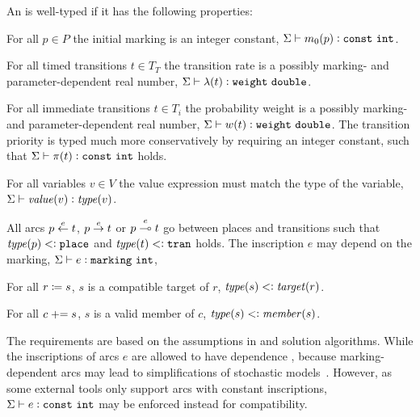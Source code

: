 \begin{dfn}
  An  is well-typed if it has the following properties:
  \begin{compactitem}
  \item For all \(p \in P\) the initial marking is an integer constant, \(\Sigma \vdash m_0(p) \mathrel{\vcentcolon} \texttt{\upshape const}\ \texttt{\upshape int}\).
  \item For all timed transitions \(t \in T_T\) the transition rate is a possibly marking- and parameter-dependent real number, \(\Sigma \vdash \lambda(t) \mathrel{\vcentcolon} \texttt{\upshape weight}\ \texttt{\upshape double}\).
  \item For all immediate transitions \(t \in T_i\) the probability weight is a possibly marking- and parameter-dependent real number, \(\Sigma \vdash w(t) \mathrel{\vcentcolon} \texttt{\upshape weight}\ \texttt{\upshape double}\). The transition priority is typed much more conservatively by requiring an integer constant, such that \(\Sigma \vdash \pi(t) \mathrel{\vcentcolon} \texttt{\upshape const}\ \texttt{\upshape int}\) holds.
  \item For all variables \(v \in V\) the value expression must match the type of the variable, \(\Sigma \vdash \textrm{\itshape value\/}(v) \mathrel{\vcentcolon} \textrm{\itshape type\/}(v)\).
  \item All arcs \(p \overset{e}{\leftarrow} t\), \(p \overset{e}{\rightarrow} t\) or \(p \overset{e}{\multimap} t\) go between places and transitions such that \(\textrm{\itshape type\/}(p) \mathrel{<\vcentcolon} \texttt{\upshape place}\) and \(\textrm{\itshape type\/}(t) \mathrel{<\vcentcolon} \texttt{\upshape tran}\) holds. The inscription \(e\) may depend on the marking, \(\Sigma \vdash e \mathrel{\vcentcolon} \texttt{\upshape marking}\ \texttt{\upshape int}\),
  \item For all \(r \coloneq s\), \(s\) is a compatible target of \(r\), \(\textrm{\itshape type\/}(s) \mathrel{<\vcentcolon} \textrm{\itshape target\/}(r)\).
  \item For all \(c \mathrel{{+}{=}} s\), \(s\) is a valid member of \(c\), \(\textrm{\itshape type\/}(s) \mathrel{<\vcentcolon} \textrm{\itshape member\/}(s)\).
  \end{compactitem}
\end{dfn}

The requirements are based on the assumptions in  and  solution algorithms. While the inscriptions of arcs \(e\) are allowed to have dependence , because marking-dependent arcs may lead to simplifications of stochastic models~\citep{Ciardo93decomposition}. However, as some external tools only support arcs with constant inscriptions, \(\Sigma \vdash e \mathrel{\vcentcolon} \texttt{\upshape const}\ \texttt{\upshape int}\) may be enforced instead for compatibility.

